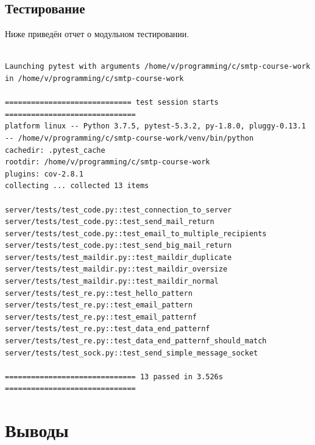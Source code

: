 \documentclass[a4paper,12pt]{report}
\begin{document}
\vspace{100mm}

\section{Тестирование}

Ниже приведён отчет о модульном тестировании.

\begin{verbatim}

Launching pytest with arguments /home/v/programming/c/smtp-course-work in /home/v/programming/c/smtp-course-work

============================= test session starts ==============================
platform linux -- Python 3.7.5, pytest-5.3.2, py-1.8.0, pluggy-0.13.1 -- /home/v/programming/c/smtp-course-work/venv/bin/python
cachedir: .pytest_cache
rootdir: /home/v/programming/c/smtp-course-work
plugins: cov-2.8.1
collecting ... collected 13 items

server/tests/test_code.py::test_connection_to_server 
server/tests/test_code.py::test_send_mail_return 
server/tests/test_code.py::test_email_to_multiple_recipients 
server/tests/test_code.py::test_send_big_mail_return
server/tests/test_maildir.py::test_maildir_duplicate 
server/tests/test_maildir.py::test_maildir_oversize 
server/tests/test_maildir.py::test_maildir_normal
server/tests/test_re.py::test_hello_pattern 
server/tests/test_re.py::test_email_pattern 
server/tests/test_re.py::test_email_patternf 
server/tests/test_re.py::test_data_end_patternf 
server/tests/test_re.py::test_data_end_patternf_should_match 
server/tests/test_sock.py::test_send_simple_message_socket 

============================== 13 passed in 3.526s ==============================

\end{verbatim}
\chapter*{Выводы}
\end{document}
